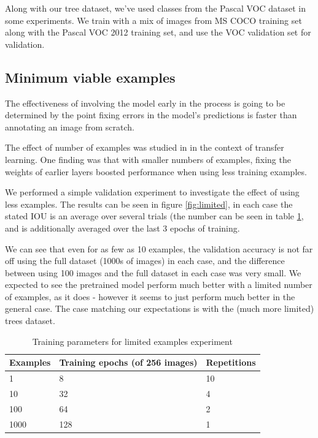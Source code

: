 \documentclass{article}
\begin{document}
Along with our tree dataset, we've used classes from the Pascal VOC dataset in some experiments. We train with a mix of images from MS COCO \cite{Lin2014} training set along with the Pascal VOC 2012 training set, and use the VOC validation set for validation.


\subsection {Minimum viable examples}

The effectiveness of involving the model early in the process is going to be determined by the point fixing errors in the model's predictions is faster than annotating an image from scratch. 

The effect of number of examples was studied in \cite{Soekhoe} in the context of transfer learning. One finding was that with smaller numbers of examples, fixing the weights of earlier layers boosted performance when using less training examples.

We performed a simple validation experiment to investigate the effect of using less examples. The results can be seen in figure \ref{fig:limited}, in each case the stated IOU is an average over several trials (the number can be seen in table \ref{fig:limit_params}, and is additionally averaged over the last 3 epochs of training.

We can see that even for as few as 10 examples, the validation accuracy is not far off using the full dataset (1000s of images) in each case, and the difference between using 100 images and the full dataset in each case was very small. We expected to see the pretrained model perform much better with a limited number of examples, as it does - however it seems to just perform much better in the general case. The case matching our expectations is with the (much more limited) trees dataset.


\begin{table}[h]
  \centering
    \caption{Training parameters for limited examples experiment}

  \begin{tabular}{ l  l  l }
    Examples & Training epochs (of 256 images) & Repetitions \\
    \toprule
    1 	  & 8 	& 10 \\
    10 	  & 32 	& 4  \\
    100   & 64 	& 2 \\
    1000  & 128 & 1 \\
    \bottomrule
  \end{tabular}
\label{fig:limit_params}
\end{table}
\end{document}
